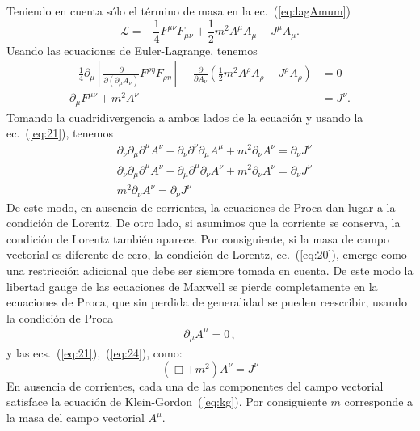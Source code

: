 \begin{frame}
Teniendo en cuenta s\'olo el t\'ermino de masa en la ec.~(\ref{eq:lagAmum})
\begin{equation}
  \label{eq:23}
  \mathcal{L}=-\frac{1}{4}F^{\mu\nu}F_{\mu\nu}+\frac{1}{2}m^2A^\mu A_\mu-J^\mu A_\mu.
\end{equation}
Usando las ecuaciones de Euler-Lagrange, tenemos
\begin{align}
-\frac{1}{4}\partial_\mu
  \left[
\frac{\partial}{\partial(\partial_\mu A_\nu)}F^{\rho\eta}F_{\rho\eta}
  \right]-
\frac{\partial}{\partial A_\nu}
\left(
\frac{1}{2}m^2A^\rho A_\rho-J^\rho A_\rho
\right)&=0\nonumber\\
\label{eq:24}
\partial_\mu F^{\mu\nu}+m^2A^\nu&=J^\nu.
\end{align}
Tomando la cuadridivergencia a ambos lados de la ecuaci\'on y usando la
ec.~(\ref{eq:21}), tenemos
\begin{align}
 &\partial_\nu\partial_\mu\partial^\mu A^\nu-\partial_\nu\partial^\nu\partial_\mu A^\mu+m^2\partial_\nu A^\nu=\partial_\nu J^\nu\nonumber\\
 &\partial_\nu\partial_\mu\partial^\mu A^\nu-\partial_\mu\partial^\mu\partial_\nu A^\nu+m^2\partial_\nu A^\nu=\partial_\nu J^\nu\nonumber\\
\label{eq:25}
 &m^2\partial_\nu A^\nu=\partial_\nu J^\nu
\end{align}
De este modo, en ausencia de corrientes, la ecuaciones de Proca dan
lugar a la condici\'on de Lorentz. De otro lado, si asumimos que la
corriente se conserva, la condici\'on de Lorentz tambi\'en aparece. Por
consiguiente, si la masa de campo vectorial es diferente de cero, la
condici\'on de Lorentz, ec.~(\ref{eq:20}), emerge como una restricci\'on
adicional que debe ser siempre tomada en cuenta. De este modo la
libertad gauge de las ecuaciones de Maxwell se pierde completamente en
la ecuaciones de Proca, que sin perdida de generalidad se pueden
reescribir, usando la condición de Proca
\begin{align}
\label{eq:procacon}
\partial_\mu A^\mu=0\,,
\end{align}
 y las ecs.~(\ref{eq:21}),~(\ref{eq:24}),  como:
\begin{equation}
  \label{eq:26}
   (\Box+m^2)A^\nu=J^\nu
\end{equation}
En ausencia de corrientes, cada una de las componentes del campo
vectorial satisface la ecuaci\'on de Klein-Gordon~(\ref{eq:kg}). Por
consiguiente $m$ corresponde a la masa del campo vectorial
$A^\mu$. 


\end{frame}
